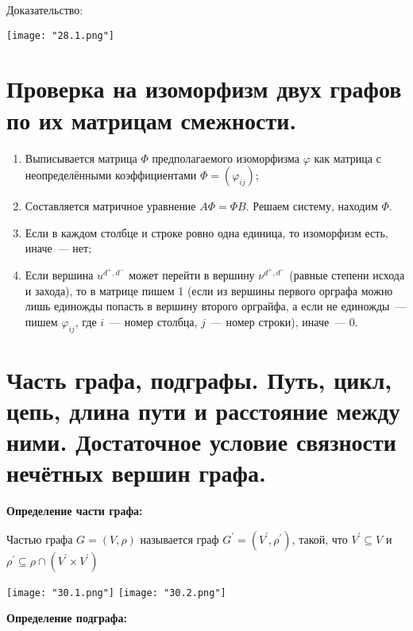     Доказательство:
    \bigskip

    \begin{center}
        \texttt{[image: "28.1.png"]}
    \end{center}

\section{Проверка на изоморфизм двух графов по их матрицам смежности.}

\begin{enumerate}
    \item{Выписывается матрица $\Phi$ предполагаемого изоморфизма $\varphi$
    как матрица с неопределёнными коэффициентами $\Phi = (\varphi_{ij})$;}
    \item{Составляется матричное уравнение $A \Phi = \Phi B$. Решаем систему,
    находим $\Phi$.}
    \item{Если в каждом столбце и строке ровно одна единица, то изоморфизм есть,
    иначе~--- нет;}
    \item{Если вершина $u^{d^{+}, d^{-}}$ может перейти в вершину $\nu^{d^{+}, d^{-}}$
    (равные степени исхода и захода), то в матрице пишем 1 (если из вершины
    первого орграфа можно лишь единожды попасть в вершину второго орграйфа,
    а если не единожды~--- пишем $\varphi_{ij}$, где $i$~--- номер столбца,
    $j$~--- номер строки), иначе~--- 0.}
\end{enumerate}

\section{Часть графа, подграфы. Путь, цикл, цепь, длина пути и расстояние между ними.
Достаточное условие связности нечётных вершин графа.}

\textbf{Определение части графа:}
    \smallskip

    Частью графа $G = (V, \rho)$ называется граф $G^{'} = (V^{'}, \rho^{'})$, такой,
    что $V^{'} \subseteq V$ и $\rho^{'} \subseteq \rho \cap (V^{'} \times V^{'})$
    \bigskip

    \begin{center}
        \texttt{[image: "30.1.png"]}
        \texttt{[image: "30.2.png"]}
    \end{center}

    \bigskip

\textbf{Определение подграфа:}
    \smallskip
    
